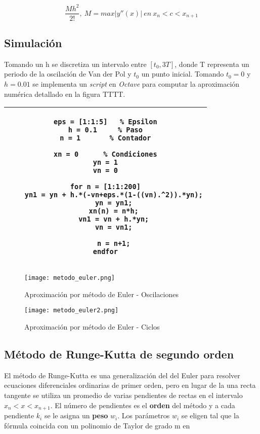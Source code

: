 \documentclass[a4paper, 10pt, spanish]{article}
\begin{document}
\begin{equation}
\frac{Mh^2}{2!},\ M = max|y''(x)|\ en\ x_n < c <x_{n+1}
\end{equation}

\subsection{Simulación}
Tomando un h se discretiza un intervalo entre $[t_0, 3T]$, donde T representa un periodo de la oscilación de Van der Pol y $t_0$ un punto inicial. Tomando $t_0 = 0$ y $h=0.01$ se implementa un \textit{script} en \textit{Octave} para computar la aproximación numérica detallado en la figura TTTT.

\begin{center}
\begin{tabular}{c}
\\
\hline
\begin{lstlisting}
eps = [1:1:5] 	% Epsilon
h = 0.1		% Paso
n = 1 		% Contador

xn = 0 		% Condiciones
yn = 1
vn = 0

for n = [1:1:200]
	yn1 = yn + h.*(-vn+eps.*(1-((vn).^2)).*yn);
	yn = yn1;
	xn(n) = n*h;
	vn1 = vn + h.*yn;
	vn = vn1;

	n = n+1;
endfor
\end{lstlisting}
\\
\hline
\end{tabular}
\end{center}

\newpage

\begin{figure}[H]
\centering
\texttt{[image: metodo\_euler.png]}
\caption{Aproximación por método de Euler - Oscilaciones}
\end{figure}

\begin{figure}[H]
\centering
\texttt{[image: metodo\_euler2.png]}
\caption{Aproximación por método de Euler - Ciclos}
\end{figure}

\newpage
\subsection{Método de Runge-Kutta de segundo orden}
El método de Runge-Kutta es una generalización del del Euler para resolver ecuaciones diferenciales ordinarias de primer orden, pero en lugar de la una recta tangente se utiliza un promedio de varias pendientes de rectas en el intervalo $x_n < x <x_{n+1}$. El número de pendientes es el \textbf{orden} del método y a cada pendiente $k_i$ se le asigna un \textbf{peso} $w_i$. Los parámetros $w_i$ se eligen tal que la fórmula coincida con un polinomio de Taylor de grado m en  
\end{document}
